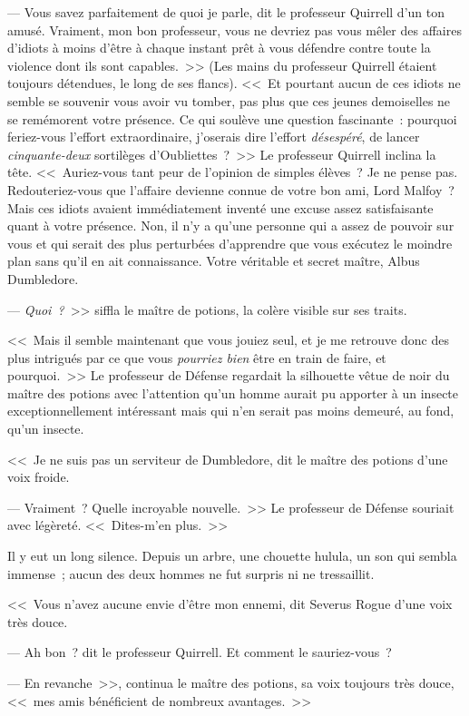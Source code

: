 --- Vous savez parfaitement de quoi je parle, dit le professeur Quirrell d'un ton amusé. Vraiment, mon bon professeur, vous ne devriez pas vous mêler des affaires d'idiots à moins d'être à chaque instant prêt à vous défendre contre toute la violence dont ils sont capables.~>> (Les mains du professeur Quirrell étaient toujours détendues, le long de ses flancs). <<~Et pourtant aucun de ces idiots ne semble se souvenir vous avoir vu tomber, pas plus que ces jeunes demoiselles ne se remémorent votre présence. Ce qui soulève une question fascinante~: pourquoi feriez-vous l'effort extraordinaire, j'oserais dire l'effort \emph{désespéré}, de lancer \emph{cinquante-deux} sortilèges d'Oubliettes~?~>> Le professeur Quirrell inclina la tête. <<~Auriez-vous tant peur de l'opinion de simples élèves~? Je ne pense pas. Redouteriez-vous que l'affaire devienne connue de votre bon ami, Lord Malfoy~? Mais ces idiots avaient immédiatement inventé une excuse assez satisfaisante quant à votre présence. Non, il n'y a qu'une personne qui a assez de pouvoir sur vous et qui serait des plus perturbées d'apprendre que vous exécutez le moindre plan sans qu'il en ait connaissance. Votre véritable et secret maître, Albus Dumbledore.

--- \emph{Quoi~?}~>> siffla le maître de potions, la colère visible sur ses traits.

<<~Mais il semble maintenant que vous jouiez seul, et je me retrouve donc des plus intrigués par ce que vous \emph{pourriez bien} être en train de faire, et pourquoi.~>> Le professeur de Défense regardait la silhouette vêtue de noir du maître des potions avec l'attention qu'un homme aurait pu apporter à un insecte exceptionnellement intéressant mais qui n'en serait pas moins demeuré, au fond, qu'un insecte.

<<~Je ne suis pas un serviteur de Dumbledore, dit le maître des potions d'une voix froide.

--- Vraiment~? Quelle incroyable nouvelle.~>> Le professeur de Défense souriait avec légèreté. <<~Dites-m'en plus.~>>

Il y eut un long silence. Depuis un arbre, une chouette hulula, un son qui sembla immense~; aucun des deux hommes ne fut surpris ni ne tressaillit.

<<~Vous n'avez aucune envie d'être mon ennemi, dit Severus Rogue d'une voix très douce.

--- Ah bon~? dit le professeur Quirrell. Et comment le sauriez-vous~?

--- En revanche~>>, continua le maître des potions, sa voix toujours très douce, <<~mes amis bénéficient de nombreux avantages.~>>

